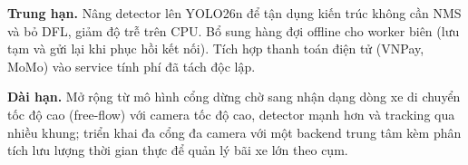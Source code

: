 \textbf{Trung hạn.} Nâng detector lên YOLO26n để tận dụng kiến trúc không cần NMS và bỏ DFL,
giảm độ trễ trên CPU. Bổ sung hàng đợi offline cho worker biên (lưu tạm và gửi lại khi phục
hồi kết nối). Tích hợp thanh toán điện tử (VNPay, MoMo) vào service tính phí đã tách độc lập.

\textbf{Dài hạn.} Mở rộng từ mô hình cổng dừng chờ sang nhận dạng dòng xe di chuyển tốc độ
cao (free-flow) với camera tốc độ cao, detector mạnh hơn và tracking qua nhiều khung; triển
khai đa cổng đa camera với một backend trung tâm kèm phân tích lưu lượng thời gian thực để
quản lý bãi xe lớn theo cụm.
